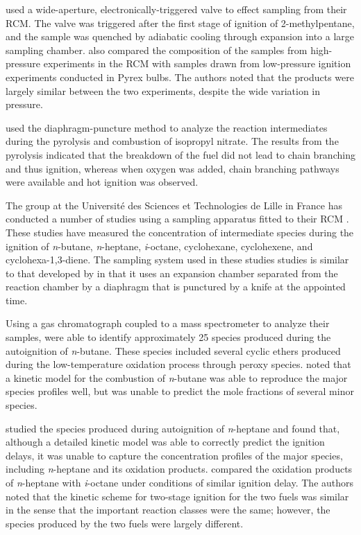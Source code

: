 \documentclass[../main.tex]{subfiles}
\begin{document}
\textcite{Affleck1967} used a wide-aperture, electronically-triggered valve
to effect sampling from their RCM. The valve was triggered after the first
stage of ignition of 2-methylpentane, and the sample was quenched by
adiabatic cooling through expansion into a large sampling chamber.
\textcite{Affleck1967} also compared the composition of the samples from
high-pressure experiments in the RCM with samples drawn from low-pressure
ignition experiments conducted in Pyrex bulbs. The authors noted that
the products were largely similar between the two experiments, despite the
wide variation in pressure.

\textcite{Beeley1980} used the diaphragm-puncture method to analyze the
reaction intermediates during the pyrolysis and combustion of isopropyl
nitrate. The results from the pyrolysis indicated that the breakdown
of the fuel did not lead to chain branching and thus ignition, whereas
when oxygen was added, chain branching pathways were available and hot
ignition was observed.

The group at the Université des Sciences et Technologies de Lille in France
has conducted a number of studies using a sampling apparatus fitted to
their RCM \cite{Minetti1994, Minetti1995, Minetti1996, Lemaire2001,
Ribaucour2002}. These studies have measured the concentration of
intermediate species during the ignition of \textit{n}-butane,
\textit{n}-heptane, \textit{i}-octane, cyclohexane, cyclohexene, and
cyclohexa-1,3-diene. The sampling system used in these studies studies
is similar to that developed by \textcite{Roblee1961} in that it uses an
expansion chamber separated from the reaction chamber by a diaphragm
that is punctured by a knife at the appointed time.

Using a gas chromatograph coupled to a mass spectrometer to analyze their
samples, \textcite{Minetti1994} were able to identify approximately 25
species produced during the autoignition of \textit{n}-butane. These
species included several cyclic ethers produced during the low-temperature
oxidation process through peroxy species. \textcite{Minetti1994} noted
that a kinetic model for the combustion of \textit{n}-butane was able
to reproduce the major species profiles well, but was unable to predict
the mole fractions of several minor species.

\textcite{Minetti1995} studied the species produced during autoignition
of \textit{n}-heptane and found that, although a detailed kinetic model
was able to correctly predict the ignition delays, it was unable to
capture the concentration profiles of the major species, including
\textit{n}-heptane and its oxidation products. \textcite{Minetti1996}
compared the oxidation products of \textit{n}-heptane with
\textit{i}-octane under conditions of similar ignition delay. The
authors noted that the kinetic scheme for two-stage ignition for the
two fuels was similar in the sense that the important reaction classes
were the same; however, the species produced by the two fuels were
largely different.
\end{document}
